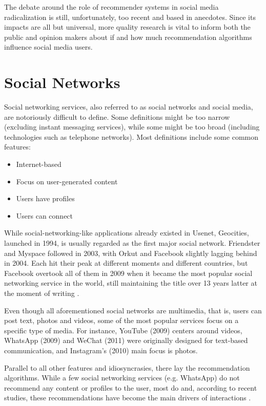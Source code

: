 The debate around the role of recommender systems in social media radicalization
is still, unfortunately, too recent and based in anecdotes. Since its impacts
are all but universal, more quality research is vital to inform both the public
and opinion makers about if and how much recommendation algorithms influence
social media users.

\section{Social Networks}
\label{sec:social_networks}

Social networking services, also referred to as social networks and social
media, are notoriously difficult to define. Some definitions might be too narrow
(excluding instant messaging services), while some might be too broad (including
technologies such as telephone networks). Most definitions
\citep{boyd_social_2007} include some common features:

\begin{itemize}
  \item Internet-based
  \item Focus on user-generated content
  \item Users have profiles
  \item Users can connect
\end{itemize}

While social-networking-like applications already existed in Usenet, Geocities,
launched in 1994, is usually regarded as the first major social network.
Friendster and Myspace followed in 2003, with Orkut and Facebook slightly
lagging behind in 2004. Each hit their peak at different moments and different
countries, but Facebook overtook all of them in 2009 when it became the most
popular social networking service in the world, still maintaining the title over
13 years latter at the moment of writing \citep{noauthor_biggest_nodate}.

Even though all aforementioned social networks are multimedia, that is, users
can post text, photos and videos, some of the most popular services focus on a
specific type of media. For instance, YouTube (2009) centers around videos,
WhatsApp (2009) and WeChat (2011) were originally designed for text-based
communication, and Instagram's (2010) main focus is photos.

Parallel to all other features and idiosyncrasies, there lay the recommendation
algorithms. While a few social networking services (e.g. WhatsApp) do not
recommend any content or profiles to the user, most do and, according to recent
studies, these recommendations have become the main drivers of interactions
\citep{stoica_algorithmic_2018}.

